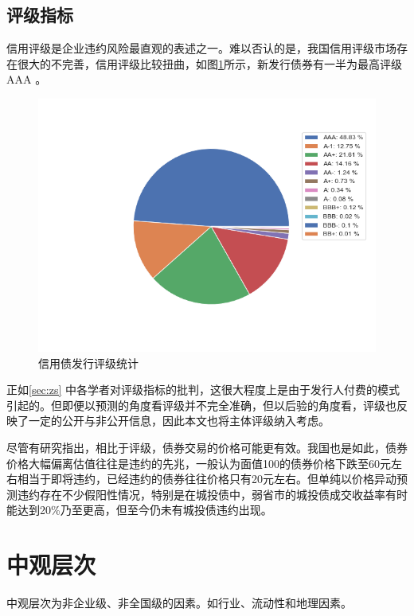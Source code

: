 \subsection{评级指标}
信用评级是企业违约风险最直观的表述之一。难以否认的是，我国信用评级市场存在很大的不完善，信用评级比较扭曲，如图\ref{fig:rating}所示，新发行债券有一半为最高评级 AAA 。
\begin{figure}[h]
	\centering
	\includegraphics[width=0.9\linewidth]{./data/rating_from_2014.png}
	\caption{\label{fig:rating}信用债发行评级统计}
\end{figure}


正如\ref{sec:zs} 中各学者对评级指标的批判，这很大程度上是由于发行人付费的模式引起的。但即便以预测的角度看评级并不完全准确，但以后验的角度看，评级也反映了一定的公开与非公开信息，因此本文也将主体评级纳入考虑。

尽管有研究指出，相比于评级，债券交易的价格可能更有效\cite{badoer2019relevance}。我国也是如此，债券价格大幅偏离估值往往是违约的先兆，一般认为面值100的债券价格下跌至60元左右相当于即将违约，已经违约的债券往往价格只有20元左右。但单纯以价格异动预测违约存在不少假阳性情况，特别是在城投债中，弱省市的城投债成交收益率有时能达到20\%乃至更高，但至今仍未有城投债违约出现。

\section{中观层次}
中观层次为非企业级、非全国级的因素。如行业、流动性和地理因素。

